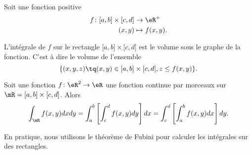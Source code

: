 Soit une fonction positive
\begin{equation}
    \begin{aligned}
        f\colon \mathopen[ a , b \mathclose]\times\mathopen[ c , d \mathclose]&\to \eR^+ \\
        (x,y)&\mapsto f(x,y). 
    \end{aligned}
\end{equation}

L'intégrale de $f$ sur le rectangle $\mathopen[ a , b \mathclose]\times\mathopen[ c , d \mathclose]$ est le volume sous le graphe de la fonction. C'est à dire le volume de l'ensemble
\begin{equation}
    \{ (x,y,z)\tq (x,y)\in\mathopen[ a , b \mathclose]\times\mathopen[ c , d \mathclose], z\leq f(x,y) \}.
\end{equation}

\begin{theorem}
    Soit une fonction $f\colon \eR^2\to \eR$ une fonction continue par morceaux sur $\mR=\mathopen[ a , b \mathclose]\times\mathopen[ c , d \mathclose]$. Alors
    \begin{equation}
        \int_{\mR}f(x,y)dxdy=\int_a^b\left[ \int_c^df(x,y)dy \right]dx=\int_c^d\left[ \int_a^bf(x,y)dx \right]dy.
    \end{equation}
\end{theorem}

En pratique, nous utilisons le théorème de Fubini pour calculer les intégrales sur des rectangles.


